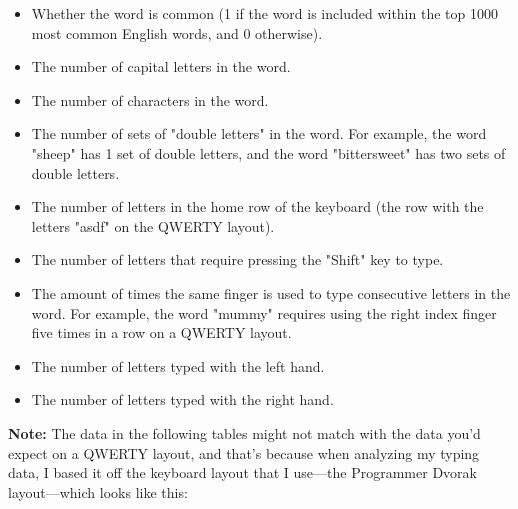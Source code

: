 \documentclass[12pt]{article}
\begin{document}
\begin{itemize}
	\item Whether the word is common (1 if the word is included within the top 1000 most common English words, and 0 otherwise).
	\item The number of capital letters in the word.
	\item The number of characters in the word.
	\item The number of sets of "double letters" in the word. For example, the word "sheep" has 1 set of double letters, and the word "bittersweet" has two sets of double letters.
	\item The number of letters in the home row of the keyboard (the row with the letters "asdf" on the QWERTY layout).
	\item The number of letters that require pressing the "Shift" key to type.
	\item The amount of times the same finger is used to type consecutive letters in the word. For example, the word "mummy" requires using the right index finger five times in a row on a QWERTY layout.
	\item The number of letters typed with the left hand.
	\item The number of letters typed with the right hand.
\end{itemize}

\textbf{Note:} The data in the following tables might not match with the data you'd expect on a QWERTY layout, and that's because when analyzing my typing data, I based it off the keyboard layout that I use—the Programmer Dvorak layout—which looks like this:
\end{document}
